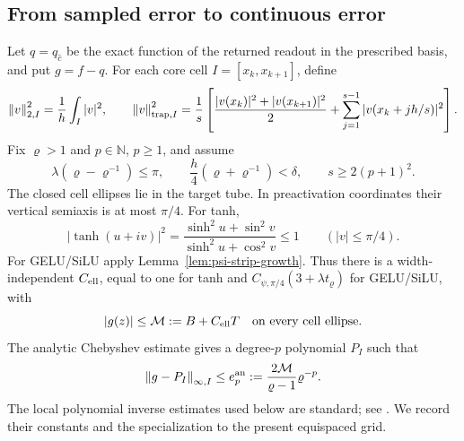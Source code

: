 \subsection{From sampled error to continuous error}
\label{sec:continuous}
Let $q=q_{\widehat c}$ be the exact function of the returned readout in the
prescribed basis, and put $g=f-q$. For each core cell $I=[x_k,x_{k+1}]$, define
\[
 \left\lVert v\right\rVert_{2,I}^2=\frac1h\int_I|v|^2,\qquad
 \left\lVert v\right\rVert_{\mathrm{trap},I}^2=
 \frac1s\left[\frac{|v(x_k)|^2+|v(x_{k+1})|^2}2
          +\sum_{j=1}^{s-1}|v(x_k+jh/s)|^2\right].
\]
Fix $\varrho>1$ and $p\in\mathbb N$, $p\ge1$, and assume
\begin{equation}
 \lambda(\varrho-\varrho^{-1})\le\pi,\qquad
 \frac h4(\varrho+\varrho^{-1})<\delta,\qquad s\ge2(p+1)^2.
 \label{eq:sampling-conditions}
\end{equation}
The closed cell ellipses lie in the target tube. In preactivation coordinates
their vertical semiaxis is at most $\pi/4$. For tanh,
\[
 |\tanh(u+iv)|^2=\frac{\sinh^2u+\sin^2v}{\sinh^2u+\cos^2v}\le1
 \qquad(|v|\le\pi/4).
\]
For GELU/SiLU apply Lemma~\ref{lem:psi-strip-growth}. Thus there is a
width-independent $C_{\rm ell}$, equal to one for tanh and
$C_{\psi,\pi/4}(3+\lambda t_\varrho)$ for GELU/SiLU, with
\begin{equation}
 |g(z)|\le\mathcal M:=B+C_{\rm ell}T
 \quad\text{on every cell ellipse}.
 \label{eq:gellipse}
\end{equation}
The analytic Chebyshev estimate \cite[Ch.~8]{trefethen2019atap} gives a
degree-$p$ polynomial $P_I$ such that
\begin{equation}
 \left\lVert g-P_I\right\rVert_{\infty,I}\le e_p^{\rm an}
 :=\frac{2\mathcal M}{\varrho-1}\varrho^{-p}.
 \label{eq:ep}
\end{equation}
The local polynomial inverse estimates used below are standard; see
\cite[Secs.~5.4.1 and 5.4.4]{Canuto2006Spectral}. We record their constants
and the specialization to the present equispaced grid.

